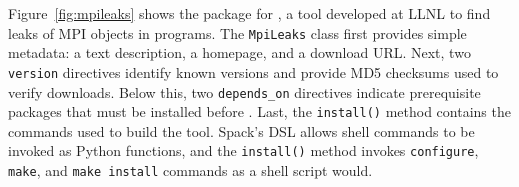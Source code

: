 Figure~\ref{fig:mpileaks} shows the package for \mpileaks, a tool developed
at LLNL to find leaks of MPI objects in programs.
The {\tt MpiLeaks} class first provides simple metadata: a text description,
a homepage, and a download URL.  
Next, two {\tt version} directives identify known versions and provide
MD5 checksums used to verify downloads.
Below this, two {\tt depends\_on}
directives indicate prerequisite packages that must be installed before \mpileaks.
Last, the {\tt install()} method contains the commands used to build
the tool.  Spack's DSL allows shell commands to be invoked as Python functions,
and the {\tt install()} method invokes {\tt configure},
{\tt make}, and {\tt make install} commands as a shell script would.







